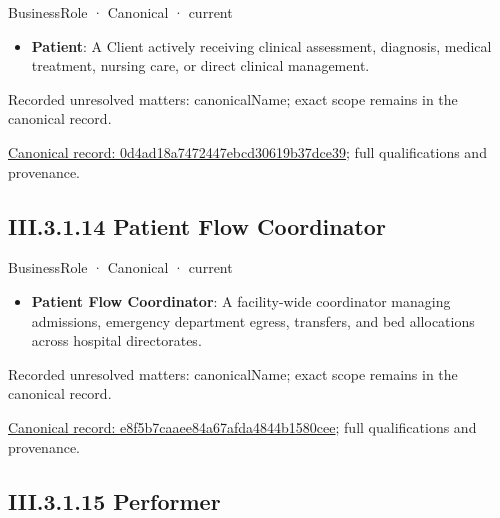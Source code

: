 \label{element:0d4ad18a7472447ebcd30619b37dce39}
{\small BusinessRole · Canonical · current}\par

\begin{itemize}


\item \textbf{Patient}: A Client actively receiving clinical assessment, diagnosis, medical treatment, nursing care, or direct clinical management.

\end{itemize}

{\small Recorded unresolved matters: canonicalName; exact scope remains in the canonical record.}\par
{\footnotesize \href{../../../../../../../continuum/business/business-role/0d4ad18a7472447ebcd30619b37dce39.md}{Canonical record: 0d4ad18a7472447ebcd30619b37dce39}; full qualifications and provenance.}\par
\subsection*{III.3.1.14 Patient Flow Coordinator}
\label{navigation:III.3.1.14}

\label{element:e8f5b7caaee84a67afda4844b1580cee}
{\small BusinessRole · Canonical · current}\par

\begin{itemize}


\item \textbf{Patient Flow Coordinator}: A facility-wide coordinator managing admissions, emergency department egress, transfers, and bed allocations across hospital directorates.

\end{itemize}

{\small Recorded unresolved matters: canonicalName; exact scope remains in the canonical record.}\par
{\footnotesize \href{../../../../../../../continuum/business/business-role/e8f5b7caaee84a67afda4844b1580cee.md}{Canonical record: e8f5b7caaee84a67afda4844b1580cee}; full qualifications and provenance.}\par
\subsection*{III.3.1.15 Performer}
\label{navigation:III.3.1.15}


